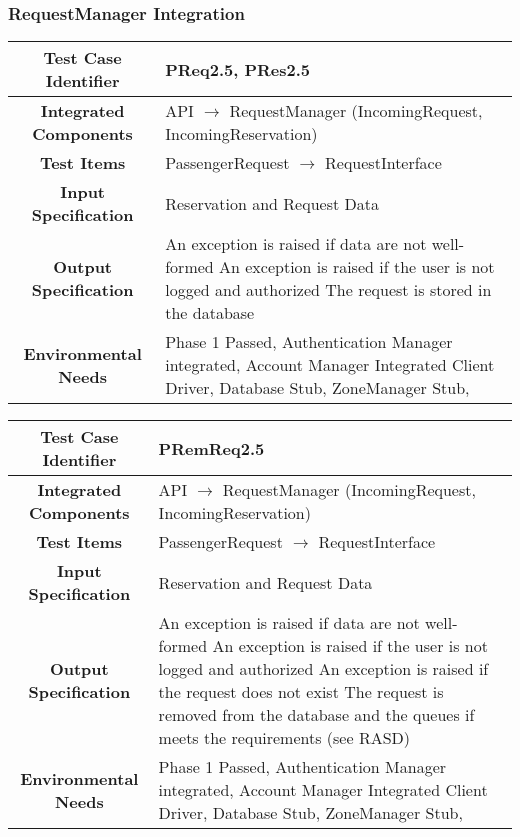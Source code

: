 \documentclass[11pt, a4paper,titlepage]{article}
\begin{document}
	 \subsubsection{RequestManager Integration}
	 	\begin{tabularx}{\textwidth}{| c|X|}
	 		\hline \textbf{Test Case Identifier} & \label{PReq2.5}PReq2.5, \label{PRes2.5}PRes2.5 \\
	 		\hline \textbf{Integrated Components} & API  $\rightarrow $ RequestManager (IncomingRequest, IncomingReservation) \\
	 		\hline \textbf{Test Items} & PassengerRequest $\rightarrow $ RequestInterface \\
	 		\hline \textbf{Input Specification} & Reservation and Request Data \\
	 		\hline \textbf{Output Specification} & An exception is raised if data are not well-formed \newline
												   An exception is raised if the user is not logged and authorized \newline
												   The request is stored in the database\\
	 		\hline \textbf{Environmental Needs} &  Phase 1 Passed, Authentication Manager integrated, Account Manager Integrated \newline 
	 		Client Driver, Database Stub, ZoneManager Stub,\\
	 		\hline
	 	\end{tabularx}
	 	\newline
	 \begin{tabularx}{\textwidth}{| c|X|}
	 	\hline \textbf{Test Case Identifier} & \label{PRemReq2.5}PRemReq2.5 \\
	 	\hline \textbf{Integrated Components} & API  $\rightarrow $ RequestManager (IncomingRequest, IncomingReservation) \\
	 	\hline \textbf{Test Items} & PassengerRequest $\rightarrow $ RequestInterface \\
	 	\hline \textbf{Input Specification} & Reservation and Request Data \\
	 	\hline \textbf{Output Specification} & An exception is raised if data are not well-formed \newline
	 	An exception is raised if the user is not logged and authorized \newline
	 	An exception is raised if the request does not exist \newline
	 	The request is removed from the database and the queues if meets the requirements (see RASD)\\
	 	\hline \textbf{Environmental Needs} &  Phase 1 Passed, Authentication Manager integrated, Account Manager Integrated \newline 
	 	Client Driver, Database Stub, ZoneManager Stub,\\
	 	\hline
	 \end{tabularx}
	 \newline
	 
\end{document}
